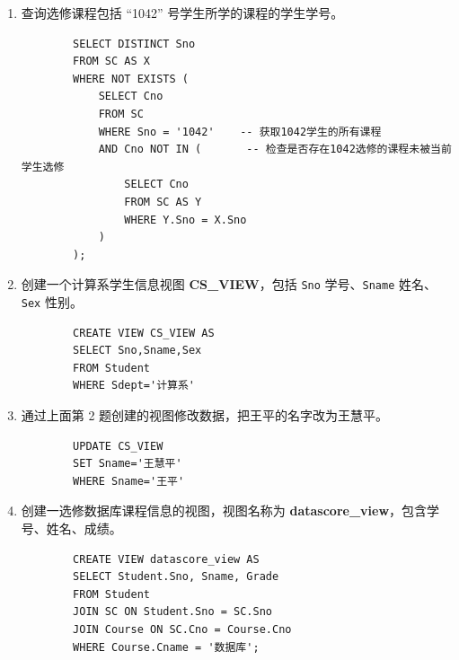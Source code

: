 \documentclass[a4paper,12pt,UTF8]{ctexart}
\begin{document}
\begin{enumerate}
    \item 查询选修课程包括 “1042” 号学生所学的课程的学生学号。\\
    \begin{lstlisting}
        SELECT DISTINCT Sno
        FROM SC AS X
        WHERE NOT EXISTS (
            SELECT Cno
            FROM SC
            WHERE Sno = '1042'    -- 获取1042学生的所有课程
            AND Cno NOT IN (       -- 检查是否存在1042选修的课程未被当前学生选修
                SELECT Cno
                FROM SC AS Y
                WHERE Y.Sno = X.Sno
            )
        );
    \end{lstlisting}
    \item 创建一个计算系学生信息视图 \textbf{CS\_VIEW}，包括 \texttt{Sno} 学号、\texttt{Sname} 姓名、\texttt{Sex} 性别。
    \begin{lstlisting}
        CREATE VIEW CS_VIEW AS
        SELECT Sno,Sname,Sex
        FROM Student
        WHERE Sdept='计算系'
    \end{lstlisting}
    \item 通过上面第 2 题创建的视图修改数据，把王平的名字改为王慧平。
    \begin{lstlisting}
        UPDATE CS_VIEW
        SET Sname='王慧平'
        WHERE Sname='王平'
    \end{lstlisting}
    \item 创建一选修数据库课程信息的视图，视图名称为 \textbf{datascore\_view}，包含学号、姓名、成绩。
    \begin{lstlisting}
        CREATE VIEW datascore_view AS
        SELECT Student.Sno, Sname, Grade
        FROM Student
        JOIN SC ON Student.Sno = SC.Sno
        JOIN Course ON SC.Cno = Course.Cno
        WHERE Course.Cname = '数据库';
    \end{lstlisting}
\end{enumerate}
\end{document}
